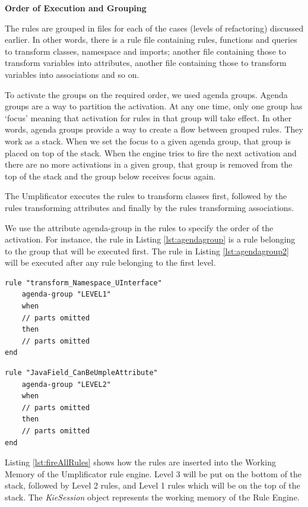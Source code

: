 \textbf{Order of Execution and Grouping}

The rules are grouped in files for each of the cases (levels of refactoring) discussed earlier. In other words, there is a rule file containing rules, functions and queries to transform classes, namespace and imports; another file containing those to transform variables into attributes, another file containing those to transform variables into associations and so on.

To activate the groups on the required order, we used agenda groups. Agenda groups are a way to partition the activation. At any one time, only one group has `focus' meaning that activation for rules in that group will take effect. 
In other words, agenda groups provide a way to create a flow between grouped rules. They work as a stack. When we set the focus to a given agenda group, that group is placed on top of the stack. When the engine tries to fire the next activation and there are no more activations in a given group, that group is removed from the top of the stack and the group below receives focus again.

The Umplificator executes the rules to transform classes first, followed by the rules transforming attributes and finally by the rules transforming associations. 

We use the attribute agenda-group in the rules to specify the order of the activation. For instance, the rule in Listing \ref{lst:agendagroup} is a rule belonging to the group that will be executed first. The rule in Listing \ref{lst:agendagroup2} will be executed after any rule belonging to the first level. 

\begin{lstlisting}[language={drools},label={lst:agendagroup}, caption=A rule belonging to Level 1] 
rule "transform_Namespace_UInterface"
	agenda-group "LEVEL1" 
	when
	// parts omitted
	then
	// parts omitted
end
\end{lstlisting}

\begin{lstlisting}[language={drools},label={lst:agendagroup2}, caption=A rule belonging to Level 2] 
rule "JavaField_CanBeUmpleAttribute"
	agenda-group "LEVEL2" 
	when
	// parts omitted
	then
	// parts omitted
end
\end{lstlisting}

Listing \ref{lst:fireAllRules} shows how the rules are inserted into the Working Memory of the Umplificator rule engine. Level 3 will be put on the bottom of the stack, followed by Level 2 rules, and Level 1 rules which will be on the top of the stack. The \textit{KieSession} object represents the working memory of the Rule Engine.

